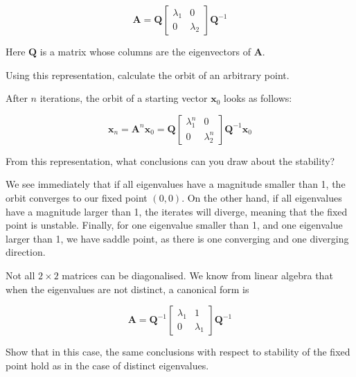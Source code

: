 \begin{equation}
{\mathbf A} = {\mathbf Q}
\begin{bmatrix}
\lambda_{1} & 0 \\
0 & \lambda_{2}
\end{bmatrix} 
{\mathbf Q^{-1}}
\end{equation} 

Here $\mathbf Q$ is a matrix whose columns are the eigenvectors of ${\mathbf A}$. 

\begin{cue}
Using this representation, calculate the orbit of an arbitrary point.
\end{cue}

After $n$ iterations, the orbit of a starting vector ${\mathbf x}_0$ looks as follows:

\begin{equation}
{\mathbf x}_n = {\mathbf A}^n {\mathbf x}_0 = {\mathbf Q}
\begin{bmatrix}
\lambda_1^n & 0 \\
0 & \lambda_2^n
\end{bmatrix} 
{\mathbf Q^{-1}} {\mathbf x}_0 
\end{equation} 

\begin{cue}
From this representation, what conclusions can you draw about the stability?  
\end{cue}

We see immediately that if all eigenvalues have a magnitude smaller than 1, the orbit converges to our fixed point $(0,0)$. On the other hand, if all eigenvalues have a magnitude larger than 1, the iterates will diverge, meaning that the fixed point is unstable. Finally, for one eigenvalue smaller than 1, and one eigenvalue larger than 1, we have saddle point, as there is one converging and one diverging direction.

\begin{exer}
  Not all $2 \times 2$ matrices can be diagonalised. We know from linear algebra that when the eigenvalues are not distinct, a canonical form is
  
\begin{equation}
{\mathbf A} = 
{\mathbf Q}^{-1}
\begin{bmatrix}
\lambda_1 & 1 \\
0 & \lambda_1
\end{bmatrix} 
{\mathbf Q}^{-1}
\end{equation} 

Show that in this case, the same conclusions with respect to stability of the fixed point hold as in the case of distinct eigenvalues.
\end{exer}


